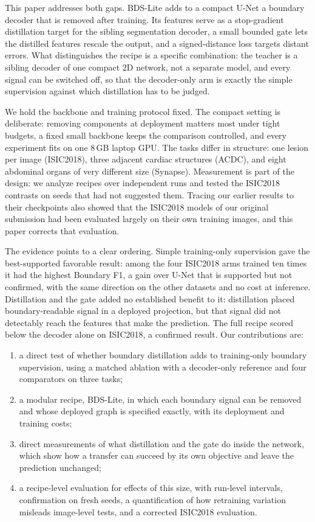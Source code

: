 \documentclass[fleqn,10pt,lineno]{wlpeerj}
\begin{document}
This paper addresses both gaps. BDS-Lite adds to a compact U-Net \citep{Ronneberger2015UNet} a boundary decoder that is removed after training. Its features serve as a stop-gradient distillation target for the sibling segmentation decoder, a small bounded gate lets the distilled features rescale the output, and a signed-distance loss targets distant errors. What distinguishes the recipe is a specific combination: the teacher is a sibling decoder of one compact 2D network, not a separate model, and every signal can be switched off, so that the decoder-only arm is exactly the simple supervision against which distillation has to be judged.

We hold the backbone and training protocol fixed. The compact setting is deliberate: removing components at deployment matters most under tight budgets, a fixed small backbone keeps the comparison controlled, and every experiment fits on one 8\,GB laptop GPU. The tasks differ in structure: one lesion per image (ISIC2018), three adjacent cardiac structures (ACDC), and eight abdominal organs of very different size (Synapse). Measurement is part of the design: we analyze recipes over independent runs and tested the ISIC2018 contrasts on seeds that had not suggested them. Tracing our earlier results to their checkpoints also showed that the ISIC2018 models of our original submission had been evaluated largely on their own training images, and this paper corrects that evaluation.

The evidence points to a clear ordering. Simple training-only supervision gave the best-supported favorable result: among the four ISIC2018 arms trained ten times it had the highest Boundary F1, a gain over U-Net that is supported but not confirmed, with the same direction on the other datasets and no cost at inference. Distillation and the gate added no established benefit to it: distillation placed boundary-readable signal in a deployed projection, but that signal did not detectably reach the features that make the prediction. The full recipe scored below the decoder alone on ISIC2018, a confirmed result. Our contributions are:
\begin{enumerate}
\item a direct test of whether boundary distillation adds to training-only boundary supervision, using a matched ablation with a decoder-only reference and four comparators on three tasks;
\item a modular recipe, BDS-Lite, in which each boundary signal can be removed and whose deployed graph is specified exactly, with its deployment and training costs;
\item direct measurements of what distillation and the gate do inside the network, which show how a transfer can succeed by its own objective and leave the prediction unchanged;
\item a recipe-level evaluation for effects of this size, with run-level intervals, confirmation on fresh seeds, a quantification of how retraining variation misleads image-level tests, and a corrected ISIC2018 evaluation.
\end{enumerate}
\end{document}
